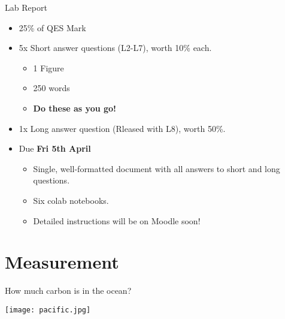 \documentclass[aspectratio=169]{beamer}
\begin{document}
\begin{frame}{Lab Report}
    \begin{itemize}
        \item 25\% of QES Mark
        \item 5x Short answer questions (L2-L7), worth 10\% each.
        \begin{itemize}
            \item 1 Figure
            \item 250 words
            \item \textbf{Do these as you go!}
        \end{itemize}
        \item 1x Long answer question (Rleased with L8), worth 50\%.
        \item Due \textbf{Fri 5th April}
        \begin{itemize}
            \item Single, well-formatted document with all answers to short and long questions.
            \item Six colab notebooks.
            \item Detailed instructions will be on Moodle soon!
        \end{itemize} 
    \end{itemize}
\end{frame}


\section{Measurement}

\begin{frame}{How much carbon is in the ocean?}
    \begin{center}
        \texttt{[image: pacific.jpg]}    
    \end{center}
    
\end{frame}
\end{document}
